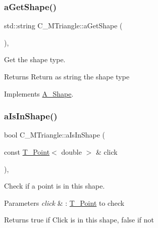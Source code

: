 \subsubsection{\texorpdfstring{a\+Get\+Shape()}{aGetShape()}\hspace{0.1cm}{\footnotesize\ttfamily [2/2]}}
{\footnotesize\ttfamily std\+::string C\+\_\+\+M\+Triangle\+::a\+Get\+Shape (\begin{DoxyParamCaption}{ }\end{DoxyParamCaption})\hspace{0.3cm}{\ttfamily [override]}, {\ttfamily [virtual]}}



Get the shape type. 

\begin{DoxyReturn}{Returns}
Return as string the shape type 
\end{DoxyReturn}


Implements \hyperlink{classA__Shape_a1b202256a4e5dcb0edab4ab93a37122c}{A\+\_\+\+Shape}.

\mbox{\label{classC__MTriangle_ae29e4f6608a0079507c6397b3dbef246}} 
\subsubsection{\texorpdfstring{a\+Is\+In\+Shape()}{aIsInShape()}\hspace{0.1cm}{\footnotesize\ttfamily [1/2]}}
{\footnotesize\ttfamily bool C\+\_\+\+M\+Triangle\+::a\+Is\+In\+Shape (\begin{DoxyParamCaption}\item[{const \hyperlink{classT__Point}{T\+\_\+\+Point}$<$ double $>$ \&}]{click }\end{DoxyParamCaption})\hspace{0.3cm}{\ttfamily [override]}, {\ttfamily [virtual]}}



Check if a point is in this shape. 


\begin{DoxyParams}{Parameters}
{\em click} & \+: \hyperlink{classT__Point}{T\+\_\+\+Point} to check \\
\hline
\end{DoxyParams}
\begin{DoxyReturn}{Returns}
true if Click is in this shape, false if not 
\end{DoxyReturn}



